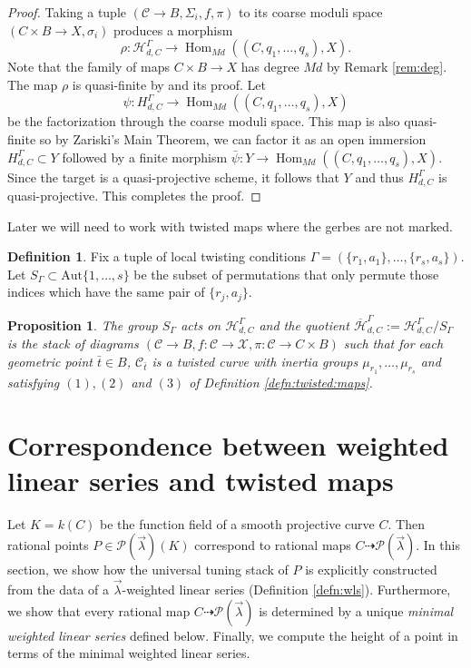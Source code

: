 \documentclass[a4paper,12pt]{amsart}
\newtheorem{prop}[thm]{Proposition}
\theoremstyle{definition}
\newtheorem{defn}[thm]{Definition}
\newcommand{\cX}{\mathcal{X}}
\newcommand{\cC}{\mathcal{C}}
\newcommand{\cH}{\mathcal{H}}
\newcommand{\Pcv}{\mathcal{P}(\vec{\lambda})}
\newcommand{\lambdavec}{{\vec{\lambda}}}
\DeclareMathOperator{\Hom}{Hom}
\begin{document}
\begin{proof}
		
		
		Taking a tuple $(\cC \to B, \Sigma_i, f, \pi)$ to its coarse moduli space $(C \times B \to X, \sigma_i)$ produces a morphism 
		$$
		\rho :\cH^\Gamma_{d, C} \to \Hom_{Md}((C, q_1, \ldots, q_s), X).
		$$
		Note that the family of maps $C \times B \to X$ has degree $Md$ by Remark \ref{rem:deg}. The map $\rho$ is quasi-finite by \cite[Prop. 4.4]{AOV} and its proof. Let $$\psi : H^\Gamma_{d,C} \to \Hom_{Md}((C, q_1, \ldots, q_s), X)$$
		be the factorization through the coarse moduli space. This map is also quasi-finite so by Zariski's Main Theorem, we can factor it as an open immersion $H^\Gamma_{d,C} \subset Y$ followed by a finite morphism $\bar{\psi} : Y \to \Hom_{Md}((C, q_1, \ldots, q_s), X)$. Since the target is a quasi-projective scheme, it follows that $Y$ and thus $H^\Gamma_{d,C}$ is quasi-projective. This completes the proof. 
	\end{proof}
	
	Later we will need to work with twisted maps where the gerbes are not marked. 
	
	\begin{defn}\label{def:Sgamma}
		Fix a tuple of local twisting conditions $\Gamma = (\{r_1, a_1\}, \ldots, \{r_s, a_s\})$. Let $S_{\Gamma} \subset \mathrm{Aut}\{1, \ldots, s\}$ be the subset of permutations that only permute those indices which have the same pair of $\{r_j, a_j\}$.
	\end{defn}
	
	\begin{prop}\label{prop:quotient-Hbar-Gamma-dC} The group $S_{\Gamma}$ acts on $\cH^{\Gamma}_{d,C}$ and the quotient $\overline{\cH}^\Gamma_{d,C}:=\cH^\Gamma_{d,C}/S_{\Gamma}$ is the stack of diagrams $(\cC \to B, f : \cC \to \cX, \pi : \cC \to C \times B)$ such that for each geometric point $\bar{t} \in B$, $\cC_{\bar{t}}$ is a twisted curve with inertia groups $\mu_{r_1}, \ldots, \mu_{r_s}$ and satisfying $(1), (2)$ and $(3)$ of Definition \ref{defn:twisted:maps}. 
	\end{prop}
	
	
	\section{Correspondence between weighted linear series and twisted maps}
	\label{sec:min-lin-ser-univ-tuning}
	
	Let $K=k(C)$ be the function field of a smooth projective curve $C$. Then rational points $P\in\Pcv(K)$ correspond to rational maps $C\dasharrow\Pcv$. In this section, we show how the universal tuning stack of $P$ is explicitly constructed from the data of a $\lambdavec$-weighted linear series (Definition \ref{defn:wls}). Furthermore, we show that every rational map $C\dasharrow\Pcv$ is determined by a unique \emph{minimal weighted linear series} defined below. Finally, we compute the height of a point in terms of the minimal weighted linear series. 
	
\end{document}
